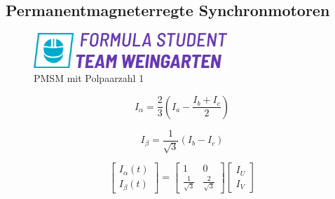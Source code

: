 \subsection{Permanentmagneterregte Synchronmotoren} \label{sec:pmsm}

\blindtext{}

\vspace{0.5cm}
\begin{figure}[h]
    \centering
    \includegraphics[width=0.65\textwidth]{media/pic.png}
    \caption{PMSM mit Polpaarzahl 1~\cite{MathWorksPMSM}}
    \label{fig:PMSM_dq}
\end{figure}

\newpage{}

\blindtext{}

\vspace{0.3cm}

\begin{formel}
    \begin{equation}
        \label{eq:clarke_alpha}
        I_\alpha = \frac{2}{3} \left(I_a - \frac{I_b + I_c}{2} \right)
    \end{equation}
    \caption[Clarke-Transformation $I_\alpha$~]{}
\end{formel}

\vspace{-1cm}

\begin{formel}
\begin{equation}
    \label{eq:clarke_beta}
    I_\beta = \frac{1}{\sqrt{3}} (I_b-I_c)
\end{equation}
    \caption[Clarke-Transformation $I_\beta$~]{}
\end{formel}

\vspace{-1cm}

\begin{formel}
    \begin{equation}
        \label{eq:clarke_mat}
        \begin{bmatrix}
            I_\alpha(t) \\
            I_\beta(t)
        \end{bmatrix} 
        = 
        \begin{bmatrix}
            1                   &   0 \\
            \frac{1}{\sqrt{3}}  &   \frac{2}{\sqrt{3}}
        \end{bmatrix}
        \begin{bmatrix}
            I_U \\
            I_V
        \end{bmatrix}
    \end{equation}
    \caption[Clarke-Transformation in Matrixschreibweise]{}
\end{formel}

